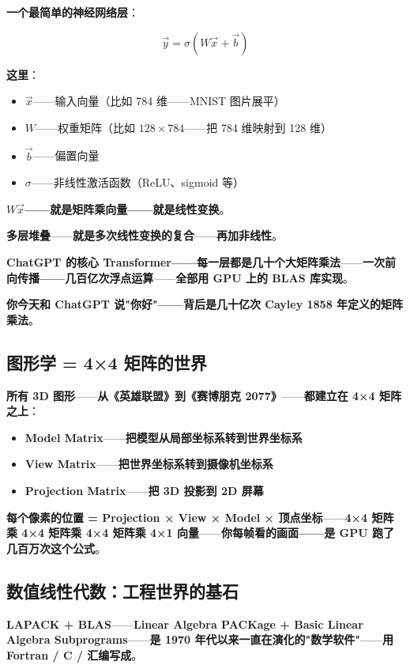\textbf{一个最简单的神经网络层}：

\[
\vec{y} = \sigma(W \vec{x} + \vec{b})
\]

\textbf{这里}：
\begin{itemize}
\item \textbf{$\vec{x}$}——输入向量（比如 784 维——MNIST 图片展平）
\item \textbf{$W$}——权重矩阵（比如 $128 \times 784$——把 784 维映射到 128 维）
\item \textbf{$\vec{b}$}——偏置向量
\item \textbf{$\sigma$}——非线性激活函数（ReLU、sigmoid 等）
\end{itemize}

\textbf{$W \vec{x}$——就是矩阵乘向量——就是线性变换}。

\textbf{多层堆叠}——\textbf{就是多次线性变换的复合}——\textbf{再加非线性}。

\textbf{ChatGPT 的核心 Transformer——每一层都是几十个大矩阵乘法}——\textbf{一次前向传播——几百亿次浮点运算}——\textbf{全部用 GPU 上的 BLAS 库实现}。

\textbf{你今天和 ChatGPT 说"你好"——背后是几十亿次 Cayley 1858 年定义的矩阵乘法}。

\subsection{图形学 = 4×4 矩阵的世界}

\textbf{所有 3D 图形}——\textbf{从《英雄联盟》到《赛博朋克 2077》}——\textbf{都建立在 4×4 矩阵之上}：

\begin{itemize}
\item \textbf{Model Matrix}——\textbf{把模型从局部坐标系转到世界坐标系}
\item \textbf{View Matrix}——\textbf{把世界坐标系转到摄像机坐标系}
\item \textbf{Projection Matrix}——\textbf{把 3D 投影到 2D 屏幕}
\end{itemize}

\textbf{每个像素的位置 = Projection × View × Model × 顶点坐标}——\textbf{4×4 矩阵乘 4×4 矩阵乘 4×4 矩阵乘 4×1 向量}——\textbf{你每帧看的画面——是 GPU 跑了几百万次这个公式}。

\subsection{数值线性代数：工程世界的基石}

\textbf{LAPACK + BLAS}——\textbf{Linear Algebra PACKage + Basic Linear Algebra Subprograms}——\textbf{是 1970 年代以来一直在演化的"数学软件"}——\textbf{用 Fortran / C / 汇编写成}。

